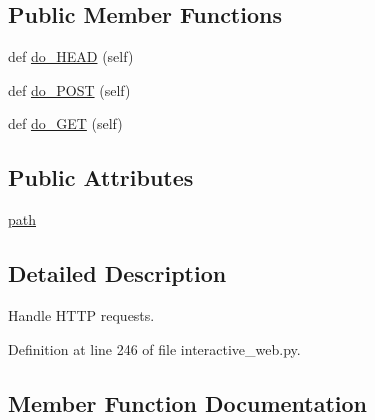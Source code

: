 \subsection*{Public Member Functions}
\begin{DoxyCompactItemize}
\item 
def \hyperlink{classparlai_1_1scripts_1_1interactive__web_1_1MyHandler_a2231328696ebba922f2e5e1d9b8ebb56}{do\+\_\+\+H\+E\+AD} (self)
\item 
def \hyperlink{classparlai_1_1scripts_1_1interactive__web_1_1MyHandler_abea6bbf8b4439489c05a388fa615506c}{do\+\_\+\+P\+O\+ST} (self)
\item 
def \hyperlink{classparlai_1_1scripts_1_1interactive__web_1_1MyHandler_aacb5ca9cbf2a9f2278d3b093e463ec00}{do\+\_\+\+G\+ET} (self)
\end{DoxyCompactItemize}
\subsection*{Public Attributes}
\begin{DoxyCompactItemize}
\item 
\hyperlink{classparlai_1_1scripts_1_1interactive__web_1_1MyHandler_ac1cd1a67cc1ed03620292e70d41125a0}{path}
\end{DoxyCompactItemize}


\subsection{Detailed Description}
\begin{DoxyVerb}Handle HTTP requests.
\end{DoxyVerb}
 

Definition at line 246 of file interactive\+\_\+web.\+py.



\subsection{Member Function Documentation}
\mbox{\label{classparlai_1_1scripts_1_1interactive__web_1_1MyHandler_aacb5ca9cbf2a9f2278d3b093e463ec00}} 
